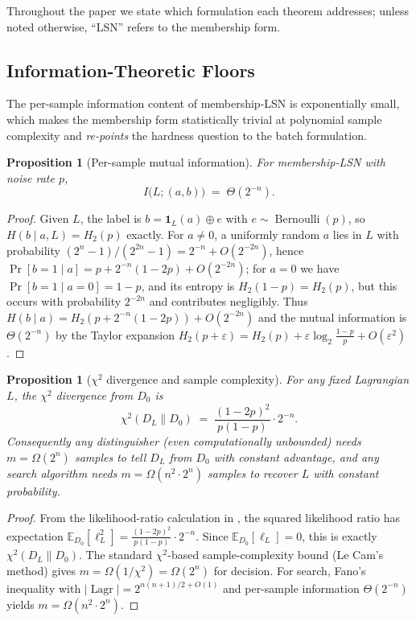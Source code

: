 \documentclass[11pt,a4paper]{article}
\theoremstyle{plain}
\newtheorem{proposition}[theorem]{Proposition}
\theoremstyle{definition}
\newcommand{\E}{\mathbb{E}}
\DeclareMathOperator{\Lagr}{Lagr}
\begin{document}
Throughout the paper we state which formulation each theorem addresses; unless noted otherwise, ``LSN'' refers to the membership form.

\subsection{Information-Theoretic Floors}
\label{sec:info-floors}

The per-sample information content of membership-LSN is exponentially small, which makes the membership form statistically trivial at polynomial sample complexity and \emph{re-points} the hardness question to the batch formulation.

\begin{proposition}[Per-sample mutual information]
\label{prop:per-sample-mi}
For membership-LSN with noise rate $p$,
\[
I\bigl(L; (a,b)\bigr) \;=\; \Theta(2^{-n}).
\]
\end{proposition}

\begin{proof}
Given $L$, the label is $b = \mathbf{1}_L(a) \oplus e$ with $e \sim \operatorname{Bernoulli}(p)$, so $H(b \mid a, L) = H_2(p)$ exactly.  For $a \neq 0$, a uniformly random $a$ lies in $L$ with probability $(2^n-1)/(2^{2n}-1) = 2^{-n} + O(2^{-2n})$, hence $\Pr[b=1 \mid a] = p + 2^{-n}(1-2p) + O(2^{-2n})$; for $a=0$ we have $\Pr[b=1 \mid a=0] = 1-p$, and its entropy is $H_2(1-p) = H_2(p)$, but this occurs with probability $2^{-2n}$ and contributes negligibly.  Thus $H(b \mid a) = H_2(p + 2^{-n}(1-2p)) + O(2^{-2n})$ and the mutual information is $\Theta(2^{-n})$ by the Taylor expansion $H_2(p+\varepsilon) = H_2(p) + \varepsilon\log_2\frac{1-p}{p} + O(\varepsilon^2)$.
\end{proof}

\begin{proposition}[$\chi^2$ divergence and sample complexity]
\label{prop:chi2-sample}
For any fixed Lagrangian $L$, the $\chi^2$ divergence from $D_0$ is
\[
\chi^2(D_L \| D_0) \;=\; \frac{(1-2p)^2}{p(1-p)} \cdot 2^{-n}.
\]
Consequently any distinguisher (even computationally unbounded) needs $m = \Omega(2^n)$ samples to tell $D_L$ from $D_0$ with constant advantage, and any search algorithm needs $m = \Omega(n^2 \cdot 2^n)$ samples to recover $L$ with constant probability.
\end{proposition}

\begin{proof}
From the likelihood-ratio calculation in , the squared likelihood ratio has expectation $\E_{D_0}[\ell_L^2] = \frac{(1-2p)^2}{p(1-p)} \cdot 2^{-n}$.  Since $\E_{D_0}[\ell_L]=0$, this is exactly $\chi^2(D_L \| D_0)$.  The standard $\chi^2$-based sample-complexity bound (Le Cam's method) gives $m = \Omega(1/\chi^2) = \Omega(2^n)$ for decision.  For search, Fano's inequality with $|\Lagr| = 2^{n(n+1)/2+O(1)}$ and per-sample information $\Theta(2^{-n})$ yields $m = \Omega(n^2 \cdot 2^n)$.
\end{proof}
\end{document}
